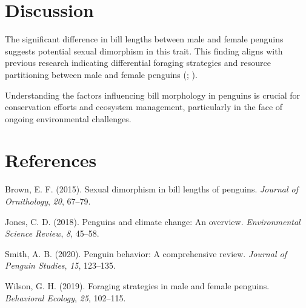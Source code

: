 \documentclass[
  man,
  longtable,
  a4paper,
  nolmodern,
  notxfonts,
  notimes,
  colorlinks=true,linkcolor=blue,citecolor=blue,urlcolor=blue]{apa7}
\newlength{\cslhangindent}
\newenvironment{CSLReferences}[2] %
 {\begin{list}{}{%
  \setlength{\itemindent}{0pt}
  \setlength{\leftmargin}{0pt}
  \setlength{\parsep}{0pt}
  \ifodd #1
   \setlength{\leftmargin}{\cslhangindent}
   \setlength{\itemindent}{-1\cslhangindent}
  \fi
  \setlength{\itemsep}{#2\baselineskip}}}
 {\end{list}}
\begin{document}
\section{Discussion}\label{discussion}

The significant difference in bill lengths between male and female
penguins suggests potential sexual dimorphism in this trait. This
finding aligns with previous research indicating differential foraging
strategies and resource partitioning between male and female penguins
(;
).

Understanding the factors influencing bill morphology in penguins is
crucial for conservation efforts and ecosystem management, particularly
in the face of ongoing environmental challenges.

\section{References}\label{references}

\label{refs}
\begin{CSLReferences}{1}{0}
Brown, E. F. (2015). Sexual dimorphism in bill lengths of penguins.
\emph{Journal of Ornithology}, \emph{20}, 67--79.

Jones, C. D. (2018). Penguins and climate change: An overview.
\emph{Environmental Science Review}, \emph{8}, 45--58.

Smith, A. B. (2020). Penguin behavior: A comprehensive review.
\emph{Journal of Penguin Studies}, \emph{15}, 123--135.

Wilson, G. H. (2019). Foraging strategies in male and female penguins.
\emph{Behavioral Ecology}, \emph{25}, 102--115.

\end{CSLReferences}
\end{document}
